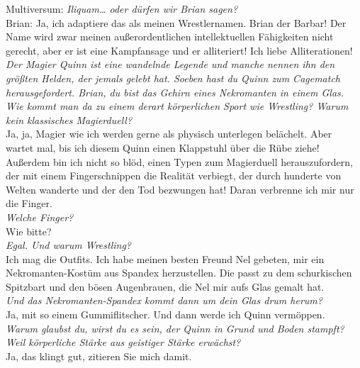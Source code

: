 \documentclass[final]{multiversum}
\begin{document}
Multiversum: \textit{Iliquam… oder dürfen wir Brian sagen?}\\
Brian: Ja, ich adaptiere das als meinen Wrestlernamen. 
Brian der Barbar! 
Der Name wird zwar meinen außerordentlichen intellektuellen Fähigkeiten nicht gerecht, aber er ist eine Kampfansage und er alliteriert! 
Ich liebe Alliterationen! \\
\textit{Der Magier Quinn ist eine wandelnde Legende und manche nennen ihn den größten Helden, der jemals gelebt hat.
 Soeben hast du Quinn zum Cagematch herausgefordert. 
 Brian, du bist das Gehirn eines Nekromanten in einem Glas. 
 Wie kommt man da zu einem derart körperlichen Sport wie Wrestling?  
 Warum kein klassisches Magierduell?}\\
Ja, ja, Magier wie ich werden gerne als physisch unterlegen belächelt. 
Aber wartet mal, bis ich diesem Quinn einen Klappstuhl über die Rübe ziehe! 
Außerdem bin ich nicht so blöd, einen Typen zum Magierduell herauszufordern, der mit einem Fingerschnippen die Realität verbiegt, der durch hunderte von Welten wanderte und der den Tod bezwungen hat! 
Daran verbrenne ich mir nur die Finger.\\
\textit{Welche Finger?}\\
Wie bitte?\\
\textit{Egal. Und warum Wrestling?}\\
Ich mag die Outfits. 
Ich habe meinen besten Freund Nel gebeten, mir ein Nekromanten-Kostüm aus Spandex herzustellen. 
Die passt zu dem schurkischen Spitzbart und den bösen Augenbrauen, die Nel mir aufs Glas gemalt hat.\\
\textit{Und das Nekromanten-Spandex kommt dann um dein Glas drum herum?}\\
Ja, mit so einem Gummiflitscher. Und dann werde ich Quinn vermöppen. \\
\textit{Warum glaubst du, wirst du es sein, der Quinn in Grund und Boden stampft? 
Weil körperliche Stärke aus geistiger Stärke erwächst?}\\
Ja, das klingt gut, zitieren Sie mich damit.
\end{document}
